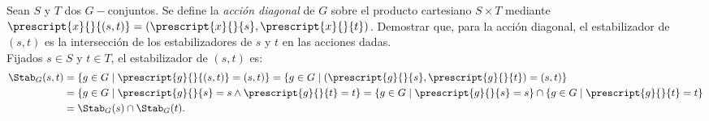 \begin{ejercicio}\label{ej:6.3}
    Sean $S$ y $T$ dos $G-$conjuntos. Se define la \emph{acción diagonal} de $G$ sobre el producto cartesiano $S \times T$ mediante $\prescript{x}{}{(s,t)} = (\prescript{x}{}{s},\prescript{x}{}{t})$. Demostrar que, para la acción diagonal, el estabilizador de $(s, t)$ es la intersección de los estabilizadores de $s$ y $t$ en las acciones dadas.\\

    Fijados $s \in S$ y $t \in T$, el estabilizador de $(s,t)$ es:
    \begin{align*}
        \Stab_{G}(s,t) &= \{g \in G \mid \prescript{g}{}{(s,t)} = (s,t)\} = \{g \in G \mid (\prescript{g}{}{s},\prescript{g}{}{t}) = (s,t)\}\\
        &= \{g \in G \mid \prescript{g}{}{s} = s \land \prescript{g}{}{t} = t\} = \{g \in G \mid \prescript{g}{}{s} = s\} \cap \{g \in G \mid \prescript{g}{}{t} = t\}\\
        &= \Stab_{G}(s) \cap \Stab_{G}(t).
    \end{align*}
\end{ejercicio}

